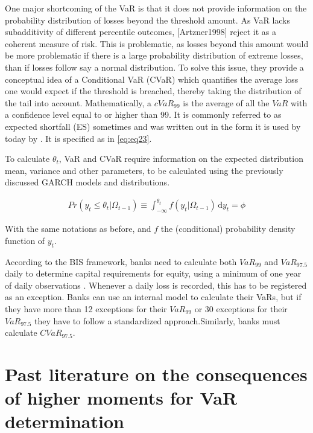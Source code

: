 \documentclass[a4paper, twoside]{templates/ociamthesis}
\begin{document}
One major shortcoming of the VaR is that it does not provide information on the probability distribution of losses beyond the threshold amount. As VaR lacks subadditivity of different percentile outcomes, {[}Artzner1998{]} reject it as a coherent measure of risk. This is problematic, as losses beyond this amount would be more problematic if there is a large probability distribution of extreme losses, than if losses follow say a normal distribution. To solve this issue, they provide a conceptual idea of a Conditional VaR (CVaR) which quantifies the average loss one would expect if the threshold is breached, thereby taking the distribution of the tail into account. Mathematically, a \(cVaR_{99}\) is the average of all the \(VaR\) with a confidence level equal to or higher than 99. It is commonly referred to as expected shortfall (ES) sometimes and was written out in the form it is used by today by \autocite{bertsimas2004}. It is specified as in \eqref{eq:eq23}.

To calculate \(\theta_t\), VaR and CVaR require information on the expected distribution mean, variance and other parameters, to be calculated using the previously discussed GARCH models and distributions.

\begin{align}
Pr(y_t \le \theta_t | \Omega_{t-1}) \equiv \int_{-\infty}^{\theta_t} \! f(y_t | \Omega_{t-1}) \, \mathrm{d}y_t = \phi
 \label{eq:eq23}
\end{align}

With the same notations as before, and \(f\) the (conditional) probability density function of \(y_t\).

According to the BIS framework, banks need to calculate both \(VaR_{99}\) and \(VaR_{97.5}\) daily to determine capital requirements for equity, using a minimum of one year of daily observations \autocite{baselcommitteeonbankingsupervision2016}. Whenever a daily loss is recorded, this has to be registered as an exception. Banks can use an internal model to calculate their VaRs, but if they have more than 12 exceptions for their \(VaR_{99}\) or 30 exceptions for their \(VaR_{97.5}\) they have to follow a standardized approach.Similarly, banks must calculate \(CVaR_{97.5}\).

\hypertarget{past-lit}{%
\section{Past literature on the consequences of higher moments for VaR determination}\label{past-lit}}
\end{document}
